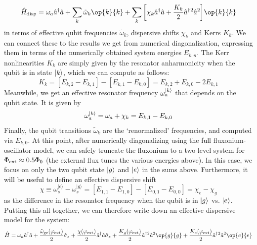\begin{equation}
    \hat{H}_{\rm disp} = \omega_a \hat{a}^\dagger\hat{a} + \sum_k \tilde{\omega}_k \op{k}{k} + \sum_k \bigg[\chi_k\hat{a}^\dagger\hat{a} + \frac{K_k}{2}\hat{a}^\dagger{}^2\hat{a}^2\bigg] \op{k}{k}
\end{equation}
in terms of effective qubit frequencies $\tilde{\omega}_k$,  dispersive shifts $\chi_k$ and Kerrs $K_k$. We can connect these to the results we get from numerical diagonalization, expressing them in terms of the numerically obtained system energies $E_{k, n}$. The Kerr nonlinearities $K_k$ are simply given by the resonator anharmonicity when the qubit is in state $\lvert k\rangle$, which we can compute as follows:
\begin{equation}
    K_k = [E_{k, 2} - E_{k, 1}] - [E_{k, 1} - E_{k, 0}] = E_{k, 2} + E_{k, 0} - 2E_{k, 1}
\end{equation}
Meanwhile, we get an effective  resonator frequency $\omega_a^{\lvert k\rangle}$ that depends on the qubit state. It is given by
\begin{equation}
    \omega_a^{\lvert k\rangle} = \omega_a + \chi_k = E_{k, 1} - E_{k, 0}
\end{equation}
Finally, the qubit transitions $\tilde{\omega}_k$ are the `renormalized' frequencies, and computed via $E_{k, 0}$. At this point, after numerically diagonalizing using the full fluxonium-oscillator model, we can safely truncate the fluxonium to a two-level system for $\Phi_{\rm ext} \approx 0.5\Phi_0$ (the external flux tunes the various energies above). In this case, we focus on only the two qubit state $\lvert g\rangle$ and $\lvert e\rangle$ in the sums above. Furthermore, it will be useful to define an effective dispersive shift
\begin{equation}
    \chi \equiv \omega_s^{|e\rangle} - \omega_s^{|g\rangle} = [E_{1,1} - E_{1, 0}] - [E_{0, 1} - E_{0, 0}]  = \chi_e - \chi_g
\end{equation}
as the difference in the resonator frequency when the qubit is in $\lvert g\rangle$ vs. $\lvert e\rangle$. Putting this all together, we can therefore write down an effective dispersive model for the system: 
\begin{equation}
    \hat{H} = \omega_a \hat{a}^\dagger\hat{a} + \frac{\tilde{\omega}_{\rm ge}(\varphi_{\rm ext})}{2} \sigmaz + \frac{\chi(\varphi_{\rm ext})}{2}\hat{a}^\dagger\hat{a}\sigmaz  + \frac{K_g(\varphi_{\rm ext})}{2}\hat{a}^\dagger{}^2\hat{a}^2\op{g}{g} + \frac{K_e(\varphi_{\rm ext})}{2}\hat{a}^\dagger{}^2\hat{a}^2\op{e}{e}
\label{eq:3_fluxonium_cQED_TLS}
\end{equation}
